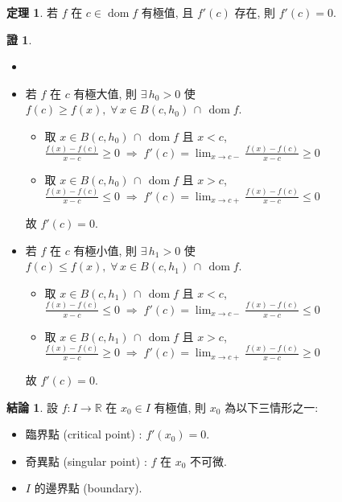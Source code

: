 \documentclass[12pt]{extarticle}
\newcommand{\ds}{\displaystyle}
\newcommand{\ie}{\;\Longrightarrow\;}
\DeclareMathOperator*{\dom}{dom}
\theoremstyle{definition}
\newtheorem*{fact}{結論}
\newtheorem*{thm}{定理}
\newtheorem*{prf}{證}
\begin{document}
\begin{thm}
  若 $f$ 在 $c\in\dom f$ 有極值, 且 $f'(c)$ 存在, 則 $f'(c) = 0$. 
\end{thm}

\begin{prf}
  \begin{itemize}\setlength\itemsep{0em}
    \item[]
    \item 若 $f$ 在 $c$ 有極大值, 則 $\ds\exists\,h_0 > 0$ 使 $\ds f(c)\geqslant f(x),\;\forall\,x\in B(c, h_0)\,\cap\,\dom{f}$. 
      \begin{itemize}\setlength\itemsep{0em}
      \item 取 $\ds x \in B(c, h_0)\,\cap\,\dom{f}$ 且 $x < c$, $\ds\frac{f(x) - f(c)}{x - c} \geqslant 0 \ie f'(c) = \lim_{x\to c-}\frac{f(x) - f(c)}{x - c}\geqslant 0$
      \item 取 $\ds x \in B(c, h_0)\,\cap\,\dom{f}$ 且 $x > c$, $\ds\frac{f(x) - f(c)}{x - c} \leqslant 0 \ie f'(c) = \lim_{x\to c+}\frac{f(x) - f(c)}{x - c}\leqslant 0$
    \end{itemize}
    故 $f'(c) = 0$. 
  \item 若 $f$ 在 $c$ 有極小值, 則 $\ds\exists\,h_1 > 0$ 使 $\ds f(c)\leqslant f(x),\;\forall\,x\in B(c, h_1)\,\cap\,\dom{f}$. 
    \begin{itemize}\setlength\itemsep{0em}
      \item 取 $\ds x \in B(c, h_1)\,\cap\,\dom{f}$ 且 $x < c$, $\ds\frac{f(x) - f(c)}{x - c} \leqslant 0 \ie f'(c) = \lim_{x\to c-}\frac{f(x) - f(c)}{x - c}\leqslant 0$
      \item 取 $\ds x \in B(c, h_1)\,\cap\,\dom{f}$ 且 $x > c$, $\ds\frac{f(x) - f(c)}{x - c} \geqslant 0 \ie f'(c) = \lim_{x\to c+}\frac{f(x) - f(c)}{x - c}\geqslant 0$
    \end{itemize}
    故 $f'(c) = 0$. 
  \end{itemize}
\end{prf}

\begin{fact}
  設 $f:I\to\mathbb{R}$ 在 $x_0\in I$ 有極值, 則 $x_0$ 為以下三情形之一: 
  \begin{multicols}{2}
    \begin{itemize}\setlength\itemsep{0em}
      \item 臨界點 (critical point) : $\ds f'(x_0) = 0$. 
      \item 奇異點 (singular point) : $f$ 在 $x_0$ 不可微.  
      \item $I$ 的邊界點 (boundary). 
    \end{itemize}
  \end{multicols}
\end{fact}
\end{document}
